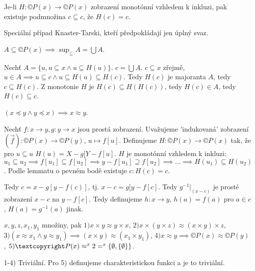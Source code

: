 \documentclass[12pt]{article}                   %
\begin{document}
    \begin{lemma}
        Je-li $H: ©P(x) \rightarrow ©P(x)$ zobrazení monotónní vzhledem k inkluzi, pak existuje podmnožina $c \subseteq c$, že $H(c) = c$.

        \begin{poznamkain}
            Speciální případ Knaster-Tarski, kteří předpokládají jen úplný svaz.
        \end{poznamkain}

        \begin{pozorovaniin}
            $A \subseteq ©P(x) \implies \sup_{\subseteq} A = \bigcup A$.
        \end{pozorovaniin}

        \begin{dukazin}
            Nechť $A = \{u, u \subseteq x \land u \subseteq H(u)\}$. $c = \bigcup A$. $c \subseteq x$ zřejmě, $u \in A \implies u \subseteq c \land u \subseteq H(u) \subseteq H(c)$. Tedy $H(c)$ je majoranta $A$, tedy $c \subseteq H(c)$. Z monotonie $H$ je $H(c) \subseteq H(H(c))$, tedy $H(c) \in A$, tedy $H(c)\subseteq c$.
        \end{dukazin}
    \end{lemma}

    \begin{veta}
        $(x \preceq y \land y \preceq x) \implies x \approx y$.
        
        \begin{dukazin}
            Nechť $f: x \rightarrow y, g: y \rightarrow x$ jsou prostá zobrazení. Uvažujeme 'indukovaná' zobrazení $(\vec{f}) : ©P(x) \rightarrow ©P(y)$, $u \mapsto f[u]$. Definujeme $H: ©P(x) \rightarrow ©P(x)$ tak, že pro $u \subseteq u$ $H(u) = X - g[Y-f[u]$. $H$ je monotónní vzhledem k inkluzi: $u_1 \subseteq u_2 \implies f[u_1] \subseteq f[u_2] \implies y - f[u_1] \supseteq f[u_2] \implies … \implies H(u_1) \subseteq H(u_2)$. Podle lemmatu o pevném bodě existuje $c: H(c) = c$.

            Tedy $c = x - g[y - f(c)]$, tj. $x - c = g[y - f[c]$. Tedy $g^{-1}|_{(x - c)}$ je prosté zobrazení $x - c$ na $y - f[c]$. Tedy definujeme $h: x \rightarrow y$, $h(a) = f(a)$ pro $a \in c$, $H(a) = g^{-1}(a)$ jinak.
        \end{dukazin}
    \end{veta}

    \begin{lemma}
            $x, y, z, x_1, y_1$ množiny, pak $1) x\times y \approx y \times x$, $2) x \times (y \times z) \approx (x \times y) \times z$, $3) (x \approx x_1 \land y \approx y_1) \implies (x\times y) \approx (x_1 \times y_1)$, $4) x \approx y \implies ©P(x) \approx ©P(y)$, $5) ©P(x) \approx ^x2 = ^x\{\O, \{\O\}\}$.

        \begin{dukazin}
            1-4) Triviální. Pro 5) definujeme charakteristickou funkci a je to triviální.
        \end{dukazin}
    \end{lemma}
\end{document}
